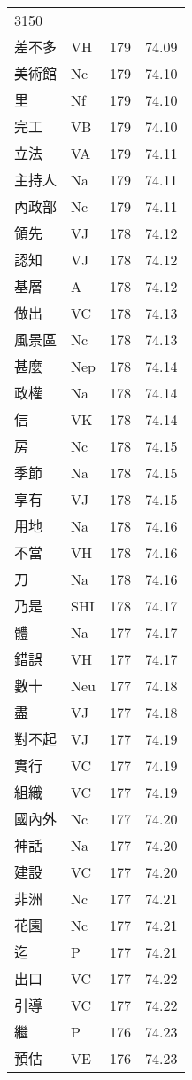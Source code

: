 \documentclass[twocolumn]{book}
\begin{document}
\begin{supertabular}{llrr}
3150\\
差不多 & VH & 179 &  74.09\\
美術館 & Nc & 179 &  74.10\\
里 & Nf & 179 &  74.10\\
完工 & VB & 179 &  74.10\\
立法 & VA & 179 &  74.11\\
主持人 & Na & 179 &  74.11\\
內政部 & Nc & 179 &  74.11\\
領先 & VJ & 178 &  74.12\\
認知 & VJ & 178 &  74.12\\
基層 & A & 178 &  74.12\\
做出 & VC & 178 &  74.13\\
風景區 & Nc & 178 &  74.13\\
甚麼 & Nep & 178 &  74.14\\
政權 & Na & 178 &  74.14\\
信 & VK & 178 &  74.14\\
房 & Nc & 178 &  74.15\\
季節 & Na & 178 &  74.15\\
享有 & VJ & 178 &  74.15\\
用地 & Na & 178 &  74.16\\
不當 & VH & 178 &  74.16\\
刀 & Na & 178 &  74.16\\
乃是 & SHI & 178 &  74.17\\
體 & Na & 177 &  74.17\\
錯誤 & VH & 177 &  74.17\\
數十 & Neu & 177 &  74.18\\
盡 & VJ & 177 &  74.18\\
對不起 & VJ & 177 &  74.19\\
實行 & VC & 177 &  74.19\\
組織 & VC & 177 &  74.19\\
國內外 & Nc & 177 &  74.20\\
神話 & Na & 177 &  74.20\\
建設 & VC & 177 &  74.20\\
非洲 & Nc & 177 &  74.21\\
花園 & Nc & 177 &  74.21\\
迄 & P & 177 &  74.21\\
出口 & VC & 177 &  74.22\\
引導 & VC & 177 &  74.22\\
繼 & P & 176 &  74.23\\
預估 & VE & 176 &  74.23\\

\end{supertabular}
\end{document}
